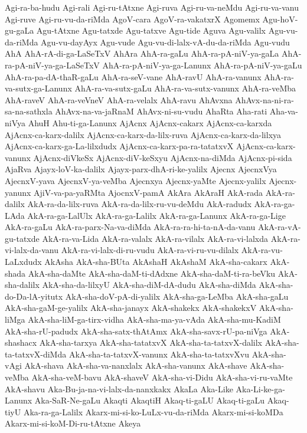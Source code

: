 {Agi-ra-ba-hudu
Agi-rali
Agi-ru-tAtxne
Agi-ruva
Agi-ru-va-neMdu
Agi-ru-va-vanu
Agi-ruve
Agi-ru-vu-da-riMda
AgoV-cara
AgoV-ra-vakatxrX
Agomemx
Agu-hoV-gu-gaLa
Agu-tAtxne
Agu-tatxde
Agu-tatxve
Agu-tide
Aguva
Agu-valilx
Agu-vu-da-riMda
Agu-vu-dayAyx
Agu-vude
Agu-vu-di-lalx-vA-du-da-riMda
Agu-vudu
AhA
AhA-rA-di-ga-LaSeTxV
AhAra
AhA-ra-gaLu
AhA-ra-pA-niV-ya-gaLa
AhA-ra-pA-niV-ya-ga-LaSeTxV
AhA-ra-pA-niV-ya-ga-Lanunx
AhA-ra-pA-niV-ya-gaLu
AhA-ra-pa-dA-thaR-gaLu
AhA-ra-seV-vane
AhA-ravU
AhA-ra-vanunx
AhA-ra-va-sutx-ga-Lanunx
AhA-ra-va-sutx-gaLu
AhA-ra-va-sutx-vanunx
AhA-ra-veMba
AhA-raveV
AhA-ra-veVneV
AhA-ra-velalx
AhA-ravu
AhAvxna
AhAvx-na-ni-ra-sa-na-sathxla
AhAvx-na-va-jaRnaM
AhAvx-ni-su-vudu
AhaRta
Aha-rati
Aha-va-niVya
AhuH
Ahu-ti-ga-Lanunx
AjAcnx
AjAcnx-cakarx
AjAcnx-ca-karxda
AjAcnx-ca-karx-dalilx
AjAcnx-ca-karx-da-lilx-ruva
AjAcnx-ca-karx-da-lilxya
AjAcnx-ca-karx-ga-La-lilxdudx
AjAcnx-ca-karx-pa-ra-tatatxvX
AjAcnx-ca-karx-vanunx
AjAcnx-diVkeSx
AjAcnx-diV-keSxyu
AjAcnx-na-diMda
AjAcnx-pi-sida
AjaRva
Ajayx-loV-ka-dalilx
Ajayx-parx-dhA-ri-ke-yalilx
Ajecnx
AjecnxVya
AjecnxV-yava
AjecnxV-ya-veMba
Ajecnxya
Ajecnx-yaMte
Ajecnx-yalilx
Ajecnx-yanunx
AjiV-va-pa-yaRMta
AjocnxV-pamA
AkAra
AkAraH
AkA-rada
AkA-ra-dalilx
AkA-ra-da-lilx-ruva
AkA-ra-da-lilx-ru-vu-deMdu
AkA-radudx
AkA-ra-ga-LAda
AkA-ra-ga-LalUlx
AkA-ra-ga-Lalilx
AkA-ra-ga-Lanunx
AkA-ra-ga-Lige
AkA-ra-gaLu
AkA-ra-parx-Na-va-diMda
AkA-ra-ra-hi-ta-nA-da-vanu
AkA-ra-vA-gu-tatxde
AkA-ra-va-Lida
AkA-ra-valalx
AkA-ra-vilalx
AkA-ra-vi-lalxda
AkA-ra-vi-lalx-da-vanu
AkA-ra-vi-lalx-di-ru-vudu
AkA-ra-vi-ru-vu-dilalx
AkA-ra-vu-LaLxdudx
AkAsha
AkA-sha-BUta
AkAshaH
AkAshaM
AkA-sha-cakarx
AkA-shada
AkA-sha-daMte
AkA-sha-daM-ti-dAdxne
AkA-sha-daM-ti-ra-beVku
AkA-sha-dalilx
AkA-sha-da-lilxyU
AkA-sha-diM-dA-dudu
AkA-sha-diMda
AkA-sha-do-Da-lA-yitutx
AkA-sha-doV-pA-di-yalilx
AkA-sha-ga-LeMba
AkA-sha-gaLu
AkA-sha-gaM-ge-yalilx
AkA-sha-janayx
AkA-shakekx
AkA-shakekxV
AkA-sha-liMga
AkA-sha-liM-ga-tirx-vidha
AkA-sha-ma-ya-vAda
AkA-sha-mu-KadiM
AkA-sha-rU-padudx
AkA-sha-satx-thAtAmx
AkA-sha-savx-rU-pa-niVga
AkA-shashacx
AkA-sha-tarxya
AkA-sha-tatatxvX
AkA-sha-ta-tatxvX-dalilx
AkA-sha-ta-tatxvX-diMda
AkA-sha-ta-tatxvX-vanunx
AkA-sha-ta-tatxvXvu
AkA-sha-vAgi
AkA-shava
AkA-sha-va-nanxlalx
AkA-sha-vanunx
AkA-shave
AkA-sha-veMba
AkA-sha-veM-bavu
AkA-shaveV
AkA-sha-vi-Didu
AkA-sha-vi-ru-vaMte
AkA-shavu
Aka-Bu-ja-na-vi-lalx-da-nanxkakx
AkaLa
Aka-Like
Aka-Li-ke-ga-Lanunx
Aka-SaR-Ne-gaLu
Akaqti
AkaqtiH
Akaq-ti-gaLU
Akaq-ti-gaLu
Akaq-tiyU
Aka-ra-ga-Lalilx
Akarx-mi-si-ko-LuLx-vu-da-riMda
Akarx-mi-si-koMDa
Akarx-mi-si-koM-Di-ru-tAtxne
Akeya
}
